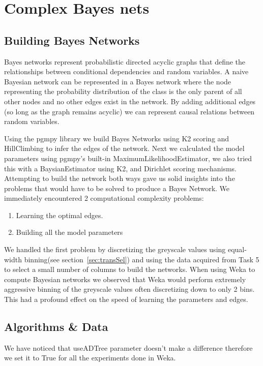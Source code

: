 \documentclass[11pt]{article}
\begin{document}
\section{Complex Bayes nets}
\subsection{Building Bayes Networks}
Bayes networks represent probabilistic directed acyclic graphs that define the relationships between conditional dependencies and random variables.
A naive Bayesian network can be represented in a Bayes network where the node representing the probability distribution of the class is the only parent of all other nodes and no other edges exist in the network. 
By adding additional edges (so long as the graph remains acyclic) we can represent causal relations between random variables.
\par
Using the pgmpy library we build Bayes Networks using K2 scoring and HillClimbing to infer the edges of the network. Next we calculated the model parameters using pgmpy's built-in MaximumLikelihoodEstimator, we also tried this with a BaysianEstimator using K2, and Dirichlet scoring mechanisms.
Attempting to build the network both ways gave us solid insights into the problems that would have to be solved to produce a Bayes Network.
We immediately encountered 2 computational complexity problems:
\begin{enumerate}
    \item Learning the optimal edges.
    \item Building all the model parameters
\end{enumerate}

We handled the first problem by discretizing the greyscale values using equal-width binning(see section~\ref{sec:transSel}) and using the data acquired from Task 5 to select a small number of columns to build the networks.
When using Weka to compute Bayesian networks we observed that Weka would perform extremely aggressive binning of the greyscale values often discretizing down to only 2 bins. This had a profound effect on the speed of learning the parameters and edges.

\subsection{Algorithms \& Data}
We have noticed that useADTree parameter doesn't make a difference therefore we set it to True for all the experiments done in Weka. 
\end{document}

